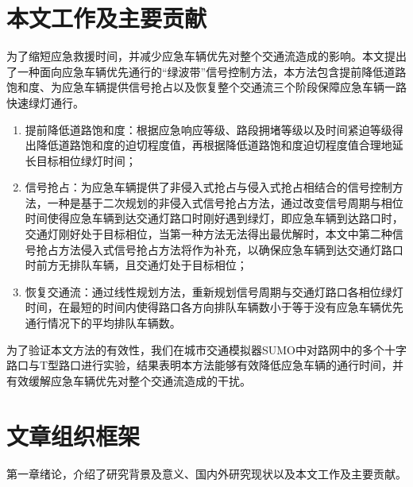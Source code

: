 \section{本文工作及主要贡献}
为了缩短应急救援时间，并减少应急车辆优先对整个交通流造成的影响。本文提出了一种面向应急车辆优先通行的“绿波带”信号控制方法，本方法包含提前降低道路饱和度、为应急车辆提供信号抢占以及恢复整个交通流三个阶段保障应急车辆一路快速绿灯通行。
\begin{enumerate}
	\item 提前降低道路饱和度：根据应急响应等级、路段拥堵等级以及时间紧迫等级得出降低道路饱和度的迫切程度值，再根据降低道路饱和度迫切程度值合理地延长目标相位绿灯时间；
	
	\item 信号抢占：为应急车辆提供了非侵入式抢占与侵入式抢占相结合的信号控制方法，一种是基于二次规划的非侵入式信号抢占方法，通过改变信号周期与相位时间使得应急车辆到达交通灯路口时刚好遇到绿灯，即应急车辆到达路口时，交通灯刚好处于目标相位，当第一种方法无法得出最优解时，本文中第二种信号抢占方法侵入式信号抢占方法将作为补充，以确保应急车辆到达交通灯路口时前方无排队车辆，且交通灯处于目标相位；
	\item 恢复交通流：通过线性规划方法，重新规划信号周期与交通灯路口各相位绿灯时间，在最短的时间内使得路口各方向排队车辆数小于等于没有应急车辆优先通行情况下的平均排队车辆数。
\end{enumerate}

为了验证本文方法的有效性，我们在城市交通模拟器SUMO\cite{behrisch2011sumo}中对路网中的多个十字路口与T型路口进行实验，结果表明本方法能够有效降低应急车辆的通行时间，并有效缓解应急车辆优先对整个交通流造成的干扰。


\section{文章组织框架}
第一章绪论，介绍了研究背景及意义、国内外研究现状以及本文工作及主要贡献。

